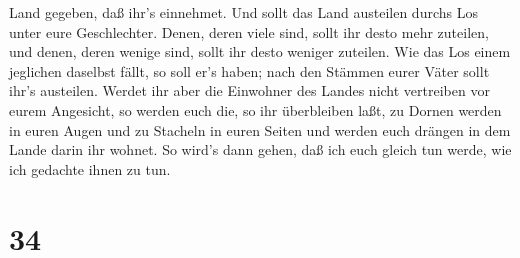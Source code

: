 Land gegeben, daß ihr's einnehmet.  Und sollt das Land
austeilen durchs Los unter eure Geschlechter. Denen, deren viele sind,
sollt ihr desto mehr zuteilen, und denen, deren wenige sind, sollt ihr
desto weniger zuteilen. Wie das Los einem jeglichen daselbst fällt, so
soll er's haben; nach den Stämmen eurer Väter sollt ihr's austeilen.
 Werdet ihr aber die Einwohner des Landes nicht vertreiben
vor eurem Angesicht, so werden euch die, so ihr überbleiben laßt, zu
Dornen werden in euren Augen und zu Stacheln in euren Seiten und werden
euch drängen in dem Lande darin ihr wohnet.  So wird's dann
gehen, daß ich euch gleich tun werde, wie ich gedachte ihnen zu tun.

\hypertarget{section-33}{%
\section{34}\label{section-33}}

